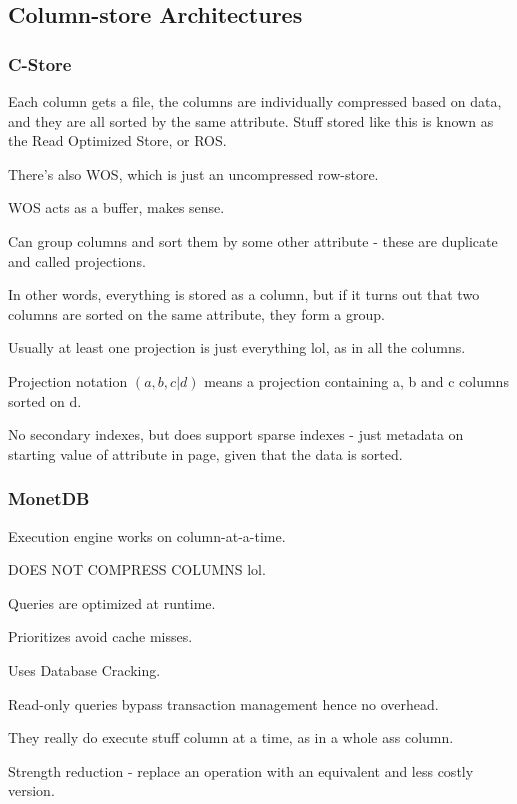 \documentclass{article}
\begin{document}
	
	\subsection{Column-store Architectures}
	
		\subsubsection{C-Store}
		
			Each column gets a file, the columns are individually compressed based on data, and they are all sorted by the same attribute. Stuff stored like this is known as the Read Optimized Store, or ROS.
			
			There's also WOS, which is just an uncompressed row-store.
			
			WOS acts as a buffer, makes sense.
			
			Can group columns and sort them by some other attribute - these are duplicate and called projections.
			
			In other words, everything is stored as a column, but if it turns out that two columns are sorted on the same attribute, they form a group.
			
			Usually at least one projection is just everything lol, as in all the columns.
			
			Projection notation $(a, b, c|d)$ means a projection containing a, b and c columns sorted on d.
			
			No secondary indexes, but does support sparse indexes - just metadata on starting value of attribute in page, given that the data is sorted.
			
		\subsubsection{MonetDB}
		
			Execution engine works on column-at-a-time.
			
			DOES NOT COMPRESS COLUMNS lol.
			
			Queries are optimized at runtime.
			
			Prioritizes avoid cache misses.
			
			Uses Database Cracking.
			
			Read-only queries bypass transaction management hence no overhead. 			
			
			They really do execute stuff column at a time, as in a whole ass column.
			
			Strength reduction - replace an operation with an equivalent and less costly version.
			
\end{document}
